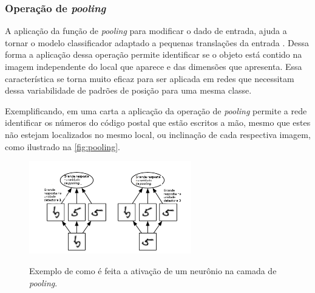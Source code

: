 \subsubsection{Operação de \textit{pooling}}
A aplicação da função de \textit{pooling} para modificar o dado de entrada, ajuda a tornar o modelo classificador adaptado a pequenas translações da entrada \cite{Goodfellow-et-al-2016}. Dessa forma a aplicação dessa operação permite identificar se o objeto está contido na imagem independente do local que aparece e das dimensões que apresenta. Essa característica se torna muito eficaz para ser aplicada em redes que necessitam dessa variabilidade de padrões de posição para uma mesma classe.

\par Exemplificando, em uma carta a aplicação da operação de \textit{pooling} permite a rede identificar os números do código postal que estão escritos a mão, mesmo que estes não estejam localizados no mesmo local, ou inclinação de cada respectiva imagem, como ilustrado na \autoref{fig:pooling}. 
\begin{figure}[H]
  \centering
  \caption{Exemplo de como é feita a ativação de um neurônio na camada de \textit{pooling}.}
  \includegraphics[width=200pt]{dados/figuras/pooling}
  \label{fig:pooling}
\end{figure}


